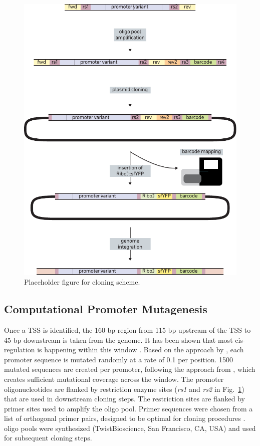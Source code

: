 \begin{figure}
    \centering
    \includegraphics{../figures/cloning_scheme.pdf}
    \caption{Placeholder figure for cloning scheme.}
    \label{fig:cloning}
\end{figure}

\subsection{Computational Promoter Mutagenesis}
Once a TSS is identified, the 160 bp region from 115 bp upstream of the TSS to 45 bp downstream is taken from the genome. It has been shown that most cis-regulation is happening within this window \cite{rydenfelt2014statistical}. Based on the approach by \cite{kinney2010using}, each promoter sequence is mutated randomly at a rate of 0.1 per position. 1500 mutated sequences are created per promoter, following the approach from \cite{ireland2020deciphering}, which creates sufficient mutational coverage across the window. The promoter oligonucleotides are flanked by restriction enzyme sites (\textit{rs1} and \textit{rs2} in Fig.~\ref{fig:cloning}) that are used in downstream cloning steps. The restriction sites are flanked by primer sites used to amplify the oligo pool. Primer sequences were chosen from a list of orthogonal primer pairs, designed to be optimal for cloning procedures \cite{subramanian2018set}. oligo pools were synthesized (TwistBioscience, San Francisco, CA, USA) and used for subsequent cloning steps.


